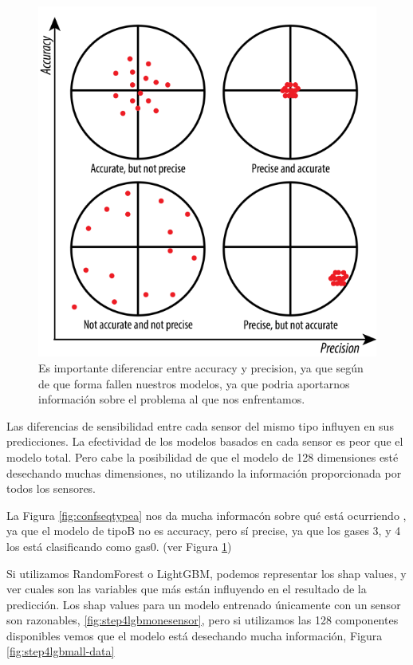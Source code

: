 \begin{figure}
	\centering
	\includegraphics[width=0.7\linewidth]{../py_imgs/precsion_vs_accuracy}
	\caption[Accuracy y precision]{Es importante diferenciar entre accuracy y precision, ya que según de que forma fallen nuestros modelos, ya que podria aportarnos información sobre el problema al que nos enfrentamos.}
	\label{fig:precisionvsaccuracy}
\end{figure}

Las diferencias de sensibilidad entre cada sensor del mismo tipo influyen en sus predicciones. La efectividad de los modelos basados en cada sensor es peor que el modelo total. Pero cabe la posibilidad de que el modelo de 128 dimensiones esté desechando muchas dimensiones, no utilizando la información proporcionada por todos los sensores.

La Figura \ref{fig:confseqtypea} nos da mucha informacón sobre qué está ocurriendo , ya que el modelo de tipoB no es accuracy, pero sí precise, ya que los gases 3, y 4 los está clasificando como gas0. (ver Figura \ref{fig:precisionvsaccuracy})

Si utilizamos RandomForest o LightGBM, podemos representar los shap values, y ver cuales son las variables que más están influyendo en el resultado de la predicción. Los shap values para un modelo entrenado únicamente con un sensor son razonables, \ref{fig:step4lgbmonesensor}, pero si utilizamos las 128 componentes disponibles vemos que el modelo está desechando mucha información, Figura \ref{fig:step4lgbmall-data}


